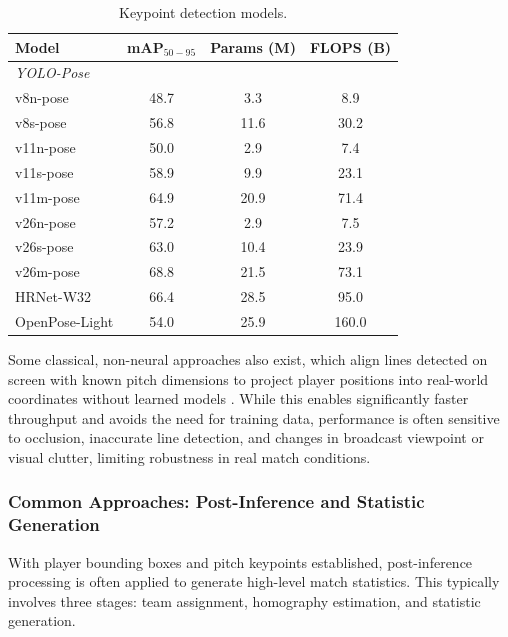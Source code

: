 \begin{table}[H]
\centering
\caption{Keypoint detection models.}
\small
\begin{tabular}{lccc}
\toprule
\textbf{Model} &
\textbf{mAP$_{50-95}$} &
\textbf{Params (M)} &
\textbf{FLOPS (B)} \\
\midrule

\textit{YOLO-Pose} \cite{Redmon_2016_CVPR, UltralyticsYOLO} & & & \\
\hspace{1em} v8n-pose  & 48.7 & 3.3  & 8.9  \\
\hspace{1em} v8s-pose  & 56.8 & 11.6 & 30.2 \\
\hspace{1em} v11n-pose & 50.0 & 2.9  & 7.4  \\
\hspace{1em} v11s-pose & 58.9 & 9.9  & 23.1 \\
\hspace{1em} v11m-pose & 64.9 & 20.9 & 71.4 \\
\hspace{1em} v26n-pose & 57.2 & 2.9  & 7.5  \\
\hspace{1em} v26s-pose & 63.0 & 10.4 & 23.9 \\
\hspace{1em} v26m-pose & 68.8 & 21.5 & 73.1 \\

HRNet-W32 \cite{9052469} & 66.4 & 28.5 & 95.0 \\
OpenPose-Light \cite{osokin2018lightweight_openpose} & 54.0 & 25.9 & 160.0 \\

\bottomrule
\end{tabular}
\label{tab:yolo11_pose_tradeoff}
\end{table}

Some classical, non-neural approaches also exist, which align lines detected on screen with known pitch dimensions to project player positions into real-world coordinates without learned models \cite{6516867}. While this enables significantly faster throughput and avoids the need for training data, performance is often sensitive to occlusion, inaccurate line detection, and changes in broadcast viewpoint or visual clutter, limiting robustness in real match conditions.
 
\subsubsection{Common Approaches: Post-Inference and Statistic Generation}
\label{subsubsec:postinference}
With player bounding boxes and pitch keypoints established, post-inference processing is often applied to generate high-level match statistics. This typically involves three stages: team assignment, homography estimation, and statistic generation.

